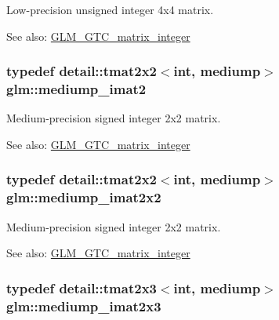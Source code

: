 Low-precision unsigned integer 4x4 matrix. \begin{Desc}
\item[See also:]\hyperlink{group__gtc__matrix__integer}{GLM\_\-GTC\_\-matrix\_\-integer} \end{Desc}
\hypertarget{group__gtc__matrix__integer_gec03a8eef2ec2536f8bebffd0bac8192}{
\subsubsection[mediump\_\-imat2]{\setlength{\rightskip}{0pt plus 5cm}typedef detail::tmat2x2$<$int, mediump$>$ {\bf glm::mediump\_\-imat2}}}
\label{group__gtc__matrix__integer_gec03a8eef2ec2536f8bebffd0bac8192}


Medium-precision signed integer 2x2 matrix. \begin{Desc}
\item[See also:]\hyperlink{group__gtc__matrix__integer}{GLM\_\-GTC\_\-matrix\_\-integer} \end{Desc}
\hypertarget{group__gtc__matrix__integer_g472222f6e3754124ee9cb64acaaedac1}{
\subsubsection[mediump\_\-imat2x2]{\setlength{\rightskip}{0pt plus 5cm}typedef detail::tmat2x2$<$int, mediump$>$ {\bf glm::mediump\_\-imat2x2}}}
\label{group__gtc__matrix__integer_g472222f6e3754124ee9cb64acaaedac1}


Medium-precision signed integer 2x2 matrix. \begin{Desc}
\item[See also:]\hyperlink{group__gtc__matrix__integer}{GLM\_\-GTC\_\-matrix\_\-integer} \end{Desc}
\hypertarget{group__gtc__matrix__integer_gbc92c714c2d257213c5b0771669df177}{
\subsubsection[mediump\_\-imat2x3]{\setlength{\rightskip}{0pt plus 5cm}typedef detail::tmat2x3$<$int, mediump$>$ {\bf glm::mediump\_\-imat2x3}}}
\label{group__gtc__matrix__integer_gbc92c714c2d257213c5b0771669df177}


